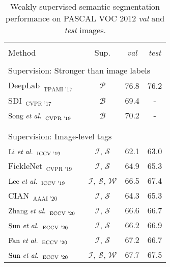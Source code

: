\documentclass[final]{cvpr}
\begin{document}
\begin{table}[t]
\renewcommand{\arraystretch}{0.95}
\centering
  \caption{Weakly supervised semantic segmentation performance on PASCAL VOC 2012 \textit{val} and \textit{test} images.}\label{table_semantic}
\vspace{-0.7em}
\begin{threeparttable}
\begin{tabular}{l@{\hskip 0.3in}c@{\hskip 0.3in}cc}
    \Xhline{1pt}\\[-0.95em]
    Method  & Sup.& \textit{val} & \textit{test}\\
    \hline\hline 
    \\[-0.9em]
    
    \multicolumn{4}{l}{Supervision: Stronger than image labels} \\
    $\text{DeepLab}_{\text{~~TPAMI '17}}$~\cite{chen2017deeplab}  & $\mathcal{P}$  & 76.8  & 76.2 \\
    $\text{SDI}_{\text{~~CVPR '17}}$~\cite{khoreva2017simple}   & $\mathcal{B}$ & 69.4  & -  \\
    $\text{Song \textit{et al.}}_{\text{~~CVPR '19}}$~\cite{song2019box}   & $\mathcal{B}$ & 70.2  & - \\
\\[-0.9em]
\hline
    \\[-0.9em]
    \multicolumn{3}{l}{Supervision: Image-level tags}\\
$\text{Li \textit{et al.}}_{\text{~~ICCV '19}}$~\cite{li2019attention}   &   $\mathcal{I}$, $\mathcal{S}$ & 62.1  & 63.0  \\
$\text{FickleNet}_{\text{~~CVPR '19}}$~\cite{lee2019ficklenet}  & $\mathcal{I}$, $\mathcal{S}$ & 64.9 & 65.3\\
    $\text{Lee \textit{et al.}}_{\text{~~ICCV '19}}$~\cite{lee2019frame}   & $\mathcal{I}$, $\mathcal{S}$, $\mathcal{W}$  & 66.5  & 67.4  \\
$\text{CIAN}_{\text{~~AAAI '20}}$~\cite{fan2018cian}    & $\mathcal{I}$, $\mathcal{S}$ & 64.3  & 65.3 \\
    $\text{Zhang \textit{et al.}}_{\text{~~ECCV '20}}$~\cite{zhangsplitting}   & $\mathcal{I}$, $\mathcal{S}$  & 66.6  & 66.7  \\
    $\text{Sun \textit{et al.}}_{\text{~~ECCV '20}}$~\cite{sun2020mining}   & $\mathcal{I}$, $\mathcal{S}$  & 66.2  & 66.9  \\
    $\text{Fan \textit{et al.}}_{\text{~~ECCV '20}}$~\cite{fanemploying}   & $\mathcal{I}$, $\mathcal{S}$  & 67.2  & 66.7  \\
    $\text{Sun \textit{et al.}}_{\text{~~ECCV '20}}$~\cite{sun2020mining}   & $\mathcal{I}$, $\mathcal{S}$, $\mathcal{W}$  & 67.7  & 67.5  \\
    

\end{tabular}
\end{threeparttable}
\end{table}
\end{document}
